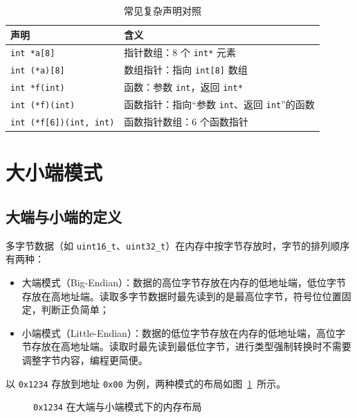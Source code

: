 \begin{table}[htbp]
\centering \caption{常见复杂声明对照} \label{tab:decl}
    \begin{tabular}{ll}
        \toprule
        声明 & 含义 \\
        \midrule
        \texttt{int *a[8]} & 指针数组：8 个 \texttt{int*} 元素 \\
        \texttt{int (*a)[8]} & 数组指针：指向 \texttt{int[8]} 数组 \\
        \texttt{int *f(int)} & 函数：参数 \texttt{int}，返回 \texttt{int*} \\
        \texttt{int (*f)(int)} & 函数指针：指向“参数 \texttt{int}、返回 \texttt{int}”的函数 \\
        \texttt{int (*f[6])(int, int)} & 函数指针数组：6 个函数指针 \\
        \bottomrule
    \end{tabular}
\end{table}
\section{大小端模式}

\subsection{大端与小端的定义}

多字节数据（如 \texttt{uint16\_t}、\texttt{uint32\_t}）在内存中按字节存放时，字节的排列顺序有两种：

\begin{itemize}
\item 大端模式（Big-Endian）：数据的高位字节存放在内存的低地址端，低位字节存放在高地址端。读取多字节数据时最先读到的是最高位字节，符号位位置固定，判断正负简单；
\item 小端模式（Little-Endian）：数据的低位字节存放在内存的低地址端，高位字节存放在高地址端。读取时最先读到最低位字节，进行类型强制转换时不需要调整字节内容，编程更简便。
\end{itemize}

以 \texttt{0x1234} 存放到地址 \texttt{0x00} 为例，两种模式的布局如图~\ref{fig:endian}~所示。

\begin{figure}[htbp]
\centering
\caption{\texttt{0x1234} 在大端与小端模式下的内存布局} \label{fig:endian}
\end{figure}

